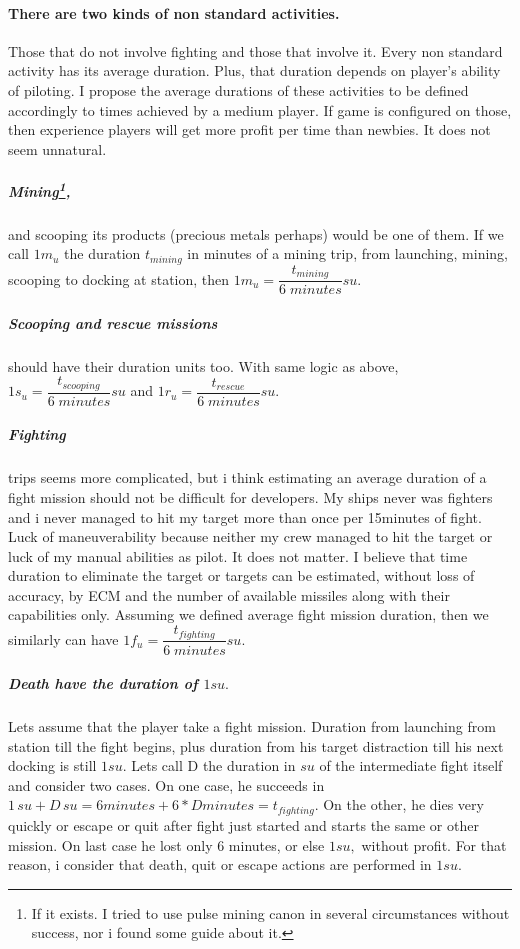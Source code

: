 \documentclass[]{article}
\begin{document}
\paragraph{There are two kinds of non standard activities.} Those that do not involve fighting and those that involve it. Every non standard activity has its average duration. Plus, that duration depends on player's ability of piloting. I propose the average durations of these activities to be defined accordingly to times achieved by a medium player. If game is configured on those, then experience players will get more profit per time than newbies. It does not seem unnatural.
\subparagraph*{Mining\footnote{If it exists. I tried to use pulse mining canon in several circumstances without success, nor i found some guide about it.},} and scooping its products (precious metals perhaps) would be one of them. If we call $ 1m_{u} $ the duration $ t_{mining} $ in minutes of a mining trip, from launching, mining, scooping to docking at station, then $ 1m_{u}=  \dfrac{t_{mining}}{6\;minutes} su$.
\subparagraph*{Scooping and rescue missions} should have their duration units too. With same logic as above, $ 1s_{u}=\dfrac{t_{scooping}}{6\;minutes} su$ and $ 1r_{u}=\dfrac{t_{rescue}}{6\;minutes} su$.
\subparagraph*{Fighting} trips seems more complicated, but i think estimating an average duration of a fight mission should not be difficult for developers. My ships never was fighters and i never managed to hit my target more than once per 15minutes of fight. Luck of maneuverability because neither my crew managed to hit the target or luck of my manual abilities as pilot. It does not matter. I believe that time duration to eliminate the target or targets can be estimated, without loss of accuracy, by ECM and the number of available missiles along with their capabilities only. Assuming we defined average fight mission duration, then we similarly can have  $ 1f_{u}=\dfrac{t_{fighting}}{6\;minutes} su$.
\subparagraph*{Death have the duration of $1su.$} Lets assume that the player take a fight mission. Duration from launching from station till the fight begins, plus duration from his target distraction till his next docking is still $1su.$ Lets call D the duration in $su$ of the intermediate fight itself and consider two cases. On one case, he succeeds in $1\,su+D\,su=6 minutes+6*D  minutes =t_{fighting}.$ On the other, he dies very quickly or escape or quit after fight just started and starts the same or other mission. On last case he lost only 6 minutes, or else $1su,$ without profit. For that reason, i consider that death, quit or escape actions are performed in $1su.$ 
\end{document}

